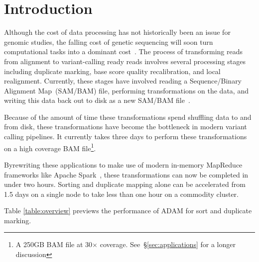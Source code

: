 \documentclass[10pt,twocolumn]{article}
\theoremstyle{plain}
\begin{document}



\cleardoublepage

\section{Introduction}
\label{sec:introduction}

Although the cost of data processing has not historically been an issue for genomic studies, the falling cost of genetic
sequencing will soon turn computational tasks into a dominant cost~\cite{nhgri}. The process of transforming reads
from alignment to variant-calling ready reads involves several processing stages including duplicate marking, base
score quality recalibration, and local realignment. Currently, these stages have involved reading a Sequence/Binary
Alignment Map~(SAM/BAM) file, performing transformations on the data, and writing this data back out to disk as a
new SAM/BAM file~\cite{li09}.

Because of the amount of time these transformations spend shuffling data to and from disk, these transformations have become
the bottleneck in modern variant calling pipelines. It currently takes three days to perform these transformations on a high
coverage BAM file\footnote{A 250GB BAM file at 30$\times$ coverage. See~\S\ref{sec:applications} for a longer discussion}. 

Byrewriting these applications to make use of modern in-memory MapReduce frameworks like Apache Spark~\cite{zaharia10}, these
transformations can now be completed in under two hours. Sorting and duplicate mapping alone can be accelerated from 1.5 days on a single node to take less than one hour on a commodity cluster. 

Table \ref{table:overview} previews the performance of ADAM for sort and duplicate marking.
\end{document}
